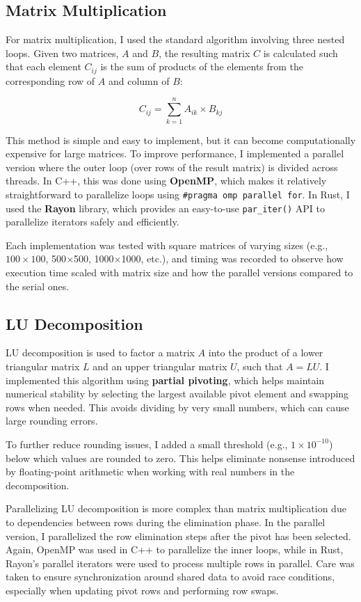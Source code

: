 \documentclass[12pt]{article}
\begin{document}
\subsection*{Matrix Multiplication}

For matrix multiplication, I used the standard algorithm involving three nested loops. Given two matrices, \( A \) and \( B \), the resulting matrix
\( C \) is calculated such that each element \( C_{ij} \) is the sum of products of the elements from the corresponding row of \( A \) and column of
\( B \):

\[
    C_{ij} = \sum_{k=1}^{n} A_{ik} \times B_{kj}
\]

This method is simple and easy to implement, but it can become computationally expensive for large matrices. To improve performance, I implemented a
parallel version where the outer loop (over rows of the result matrix) is divided across threads. In C++, this was done using \textbf{OpenMP}, which
makes it relatively straightforward to parallelize loops using \texttt{\#pragma omp parallel for}. In Rust, I used the \textbf{Rayon} library, which
provides an easy-to-use \texttt{par\_iter()} API to parallelize iterators safely and efficiently.

Each implementation was tested with square matrices of varying sizes (e.g., $100 \times 100$, 500$ \times $500, 1000$ \times $1000, etc.), and timing was
recorded to observe how execution time scaled with matrix size and how the parallel versions compared to the serial ones.

\subsection*{LU Decomposition}

LU decomposition is used to factor a matrix \( A \) into the product of a lower triangular matrix \( L \) and an upper triangular matrix \( U \), such
that \( A = LU \). I implemented this algorithm using \textbf{partial pivoting}, which helps maintain numerical stability by selecting the largest available
pivot element and swapping rows when needed. This avoids dividing by very small numbers, which can cause large rounding errors.

To further reduce rounding issues, I added a small threshold (e.g., \(1 \times 10^{-10}\)) below which values are rounded to zero. This helps eliminate nonsense
introduced by floating-point arithmetic when working with real numbers in the decomposition.

Parallelizing LU decomposition is more complex than matrix multiplication due to dependencies between rows during the elimination phase. In the parallel version,
I parallelized the row elimination steps after the pivot has been selected. Again, OpenMP was used in C++ to parallelize the inner loops, while in Rust, Rayon's
parallel iterators were used to process multiple rows in parallel. Care was taken to ensure synchronization around shared data to avoid race conditions,
especially when updating pivot rows and performing row swaps.
\end{document}
